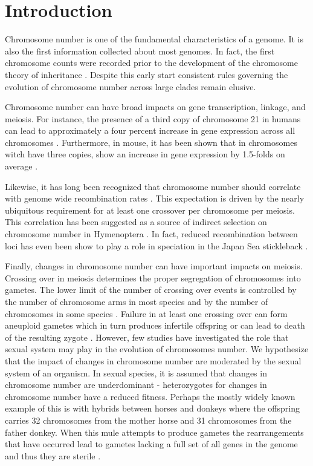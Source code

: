 \section{Introduction}
Chromosome number is one of the fundamental characteristics of a genome.
It is also the first information collected about most genomes. 
In fact, the first chromosome counts were recorded prior to the development of the chromosome theory of inheritance \citep{flemming1882}.
Despite this early start consistent rules governing the evolution of chromosome number across large clades remain elusive. 

Chromosome number can have broad impacts on gene transcription, linkage, and meiosis. 
For instance, the presence of a third copy of chromosome 21 in humans can lead to approximately a four percent increase in gene expression across all chromosomes \citep{lockstone2007}. Furthermore, in mouse, it has been shown that in chromosomes witch have three copies, show an increase in gene expression by 1.5-folds on average \citep{williams2008aneuploidy}. 

Likewise, it has long been recognized that chromosome number should correlate with genome wide recombination rates \citep{stebbins1958}.
This expectation is driven by the nearly ubiquitous requirement for at least one crossover per chromosome per meiosis\citep{dumont2017req}.
This correlation has been suggested as a source of indirect selection on chromosome number in Hymenoptera \citep{sherman1979,ross2015}.
In fact, reduced recombination between loci has even been show to play a role in speciation in the Japan Sea stickleback \citep{kitano2012}. 

Finally, changes in chromosome number can have important impacts on meiosis. 
Crossing over in meiosis determines the proper segregation of chromosomes into gametes.
The lower limit of the number of crossing over events is controlled by the number of chromosome arms in most species and by the number of chromosomes in some species \citep{dumont2017req}.
Failure in at least one crossing over can form aneuploid gametes which in turn produces infertile offspring or can lead to death of the resulting zygote \citep{hassold2001err}.
However, few studies have investigated the role that sexual system may play in the evolution of chromosomes number.  
We hypothesize that the impact of changes in chromosome number are moderated by the sexual system of an organism. 
In sexual species, it is assumed that changes in chromosome number are underdominant \citep{white1973} - heterozygotes for changes in chromosome number have a reduced fitness. 
Perhaps the mostly widely known example of this is with hybrids between horses and donkeys where the offspring carries 32 chromosomes from the mother horse and 31 chromosomes from the father donkey. 
When this mule attempts to produce gametes the rearrangements that have occurred lead to gametes lacking a full set of all genes in the genome and thus they are sterile \citep{wodsedalek1916}. 

